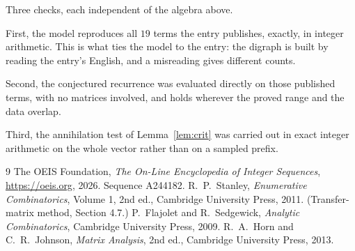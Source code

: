 \documentclass[11pt,a4paper]{article}
\theoremstyle{plain}
\theoremstyle{definition}
\begin{document}
Three checks, each independent of the algebra above.

First, the model reproduces all $19$ terms the entry publishes, exactly, in integer
arithmetic. This is what ties the model to the entry: the digraph is built by reading the
entry's English, and a misreading gives different counts.

Second, the conjectured recurrence was evaluated directly on those published terms, with no
matrices involved, and holds wherever the proved range and the data overlap.

Third, the annihilation test of Lemma~\ref{lem:crit} was carried out in exact integer
arithmetic on the whole vector rather than on a sampled prefix.

\begin{thebibliography}{9}
 The OEIS Foundation, \emph{The On-Line Encyclopedia of Integer
Sequences}, \url{https://oeis.org}, 2026. Sequence A244182.
 R.~P.~Stanley, \emph{Enumerative Combinatorics}, Volume 1, 2nd ed.,
Cambridge University Press, 2011. (Transfer-matrix method, Section 4.7.)
 P.~Flajolet and R.~Sedgewick, \emph{Analytic Combinatorics}, Cambridge
University Press, 2009.
 R.~A.~Horn and C.~R.~Johnson, \emph{Matrix Analysis}, 2nd ed., Cambridge
University Press, 2013.
\end{thebibliography}
\end{document}
